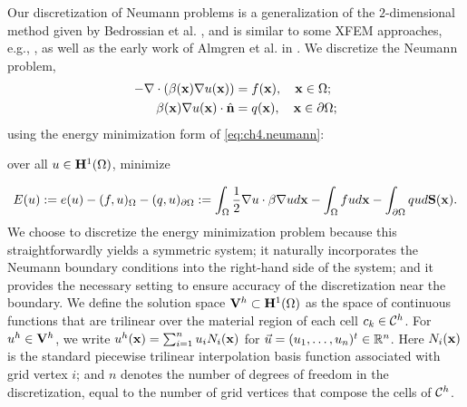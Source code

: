 Our discretization of Neumann problems is a generalization of the $2$-dimensional method given by Bedrossian et al. \cite{Bedrossian10}, and is similar to some XFEM approaches, e.g., \cite{Daux00}, as well as the early work of Almgren et al. in \cite{Almgren97}. We discretize the Neumann problem,
\begin{equation} \label{eq:ch4.neumann}
\begin{split}
-\nabla \cdot \left( \beta(\mathbf{x}) \nabla u(\mathbf{x}) \right) & = f(\mathbf{x}), \quad \mathbf{x} \in \Omega; \\
\beta(\mathbf{x}) \nabla u(\mathbf{x}) \cdot \hat{\mathbf{n}} & = q(\mathbf{x}), \quad \mathbf{x} \in \partial\Omega;
\end{split}
\end{equation}
using the energy minimization form of \eqref{eq:ch4.neumann}:
\begin{center}
over all $u \in \mathbf{H}^1(\Omega)$, minimize
\end{center}
\begin{equation} \label{eq:ch4.neumann.energy.continuous}
E(u) := e(u) - (f,u)_{\Omega} - (q,u)_{\partial\Omega} := \int_{\Omega} \frac{1}{2} \nabla u \cdot \beta \nabla u d\mathbf{x} - \int_{\Omega} f u d\mathbf{x} - \int_{\partial\Omega} q u d\mathbf{S}(\mathbf{x}).
\end{equation}
We choose to discretize the energy minimization problem because this straightforwardly yields a symmetric system; it naturally incorporates the Neumann boundary conditions into the right-hand side of the system; and it provides the necessary setting to ensure accuracy of the discretization near the boundary. We define the solution space $\mathbf{V}^h \subset \mathbf{H}^1(\Omega)$ as the space of continuous functions that are trilinear over the material region of each cell $c_k \in \mathcal{C}^h$. For $u^h \in \mathbf{V}^h$, we write $u^h(\mathbf{x}) = \sum_{i = 1}^n u_i N_i(\mathbf{x})$ for $\vec{u} = (u_1, \dotsc, u_n)^t \in \mathbb{R}^n$. Here $N_i(\mathbf{x})$ is the standard piecewise trilinear interpolation basis function associated with grid vertex $i$; and $n$ denotes the number of degrees of freedom in the discretization, equal to the number of grid vertices that compose the cells of $\mathcal{C}^h$.

